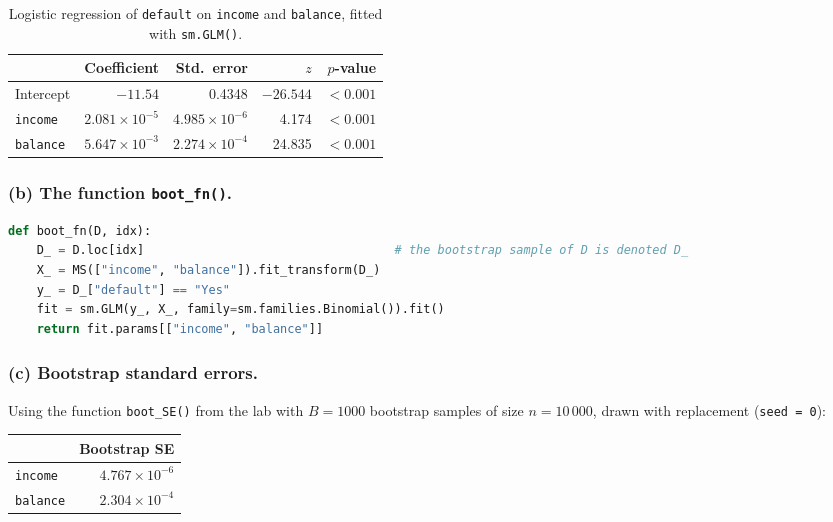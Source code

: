 \documentclass[11pt]{article}
\begin{document}
\begin{table}[H]
  \centering
  \begin{tabular}{lrrrr}
    \toprule
    & Coefficient & Std.\ error & $z$ & $p$-value \\
    \midrule
    Intercept & $-11.54$ & 0.4348 & $-26.544$ & $< 0.001$ \\
    \texttt{income} & $2.081 \times 10^{-5}$ & $4.985 \times 10^{-6}$ & 4.174 & $< 0.001$ \\
    \texttt{balance} & $5.647 \times 10^{-3}$ & $2.274 \times 10^{-4}$ & 24.835 & $< 0.001$ \\
    \bottomrule
  \end{tabular}
  \caption{Logistic regression of \texttt{default} on \texttt{income} and \texttt{balance}, fitted with \texttt{sm.GLM()}.}
\end{table}

\subsubsection*{(b) The function \texttt{boot\_fn()}.}

\begin{lstlisting}[language=Python]
def boot_fn(D, idx):
    D_ = D.loc[idx]                                   # the bootstrap sample of D is denoted D_
    X_ = MS(["income", "balance"]).fit_transform(D_)
    y_ = D_["default"] == "Yes"
    fit = sm.GLM(y_, X_, family=sm.families.Binomial()).fit()
    return fit.params[["income", "balance"]]
\end{lstlisting}

\subsubsection*{(c) Bootstrap standard errors.}
Using the function \texttt{boot\_SE()} from the lab with $B = 1000$ bootstrap samples of size $n = 10\,000$, drawn with replacement (\texttt{seed = 0}):

\begin{table}[H]
  \centering
  \begin{tabular}{lr}
    \toprule
    & Bootstrap SE \\
    \midrule
    \texttt{income} & $4.767 \times 10^{-6}$ \\
    \texttt{balance} & $2.304 \times 10^{-4}$ \\
    \bottomrule
  \end{tabular}
\end{table}
\end{document}
